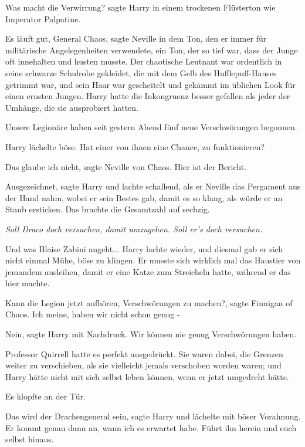 \glqq{}Was macht die Verwirrung?\grqq{} sagte Harry in einem trockenen Flüsterton
wie Imperator Palpatine.

\glqq{}Es läuft gut, General Chaos\grqq{}, sagte Neville in dem Ton, den er immer
für militärische Angelegenheiten verwendete, ein Ton, der so tief war, dass der
Junge oft innehalten und husten musste. Der chaotische Leutnant war ordentlich
in seine schwarze Schulrobe gekleidet, die mit dem Gelb des Hufflepuff-Hauses
getrimmt war, und sein Haar war gescheitelt und gekämmt im üblichen Look für
einen ernsten Jungen. Harry hatte die Inkongruenz besser gefallen als jeder der
Umhänge, die sie ausprobiert hatten.

\glqq{}Unsere Legionäre haben seit gestern Abend fünf neue Verschwörungen
begonnen.\grqq{}

Harry lächelte böse. \glqq{}Hat einer von ihnen eine Chance, zu funktionieren?\grqq{}

\glqq{}Das glaube ich nicht\grqq{}, sagte Neville von Chaos. \glqq{}Hier ist der
Bericht.\grqq{}

\glqq{}Ausgezeichnet\grqq{}, sagte Harry und lachte schallend, als er Neville das
Pergament aus der Hand nahm, wobei er sein Bestes gab, damit es so klang, als
würde er an Staub ersticken. Das brachte die Gesamtzahl auf sechzig.

\emph{Soll Draco doch versuchen, damit umzugehen. Soll er's doch versuchen.}

Und was Blaise Zabini angeht... Harry lachte wieder, und diesmal gab er sich
nicht einmal Mühe, böse zu klingen. Er musste sich wirklich mal das Haustier von
jemandem ausleihen, damit er eine Katze zum Streicheln hatte, während er das
hier machte.

\glqq{}Kann die Legion jetzt aufhören, Verschwörungen zu machen?\grqq{}, sagte
Finnigan of Chaos. \glqq{}Ich meine, haben wir nicht schon genug -\grqq{}

\glqq{}Nein\grqq{}, sagte Harry mit Nachdruck. \glqq{}Wir können nie genug
Verschwörungen haben.\grqq{}

Professor Quirrell hatte es perfekt ausgedrückt. Sie waren dabei, die Grenzen
weiter zu verschieben, als sie vielleicht jemals verschoben worden waren; und
Harry hätte nicht mit sich selbst leben können, wenn er jetzt umgedreht hätte.

Es klopfte an der Tür.

\glqq{}Das wird der Drachengeneral sein\grqq{}, sagte Harry und lächelte mit
böser Vorahnung. \glqq{}Er kommt genau dann an, wann ich es erwartet habe. Führt
ihn herein und euch selbst hinaus.\grqq{}


